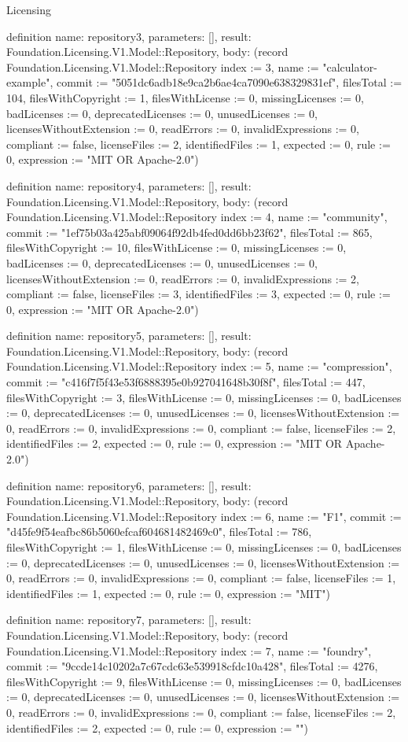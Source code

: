 \begin{lexlean}{Licensing}
\begin{semanticmodule}
definition{
  name: repository3,
  parameters: [],
  result: Foundation.Licensing.V1.Model::Repository,
  body: (record Foundation.Licensing.V1.Model::Repository {index := 3, name := "calculator-example", commit := "5051dc6adb18e9ca2b6ae4ca7090e638329831ef", filesTotal := 104, filesWithCopyright := 1, filesWithLicense := 0, missingLicenses := 0, badLicenses := 0, deprecatedLicenses := 0, unusedLicenses := 0, licensesWithoutExtension := 0, readErrors := 0, invalidExpressions := 0, compliant := false, licenseFiles := 2, identifiedFiles := 1, expected := 0, rule := 0, expression := "MIT OR Apache-2.0"})
}

definition{
  name: repository4,
  parameters: [],
  result: Foundation.Licensing.V1.Model::Repository,
  body: (record Foundation.Licensing.V1.Model::Repository {index := 4, name := "community", commit := "1ef75b03a425abf09064f92db4fed0dd6bb23f62", filesTotal := 865, filesWithCopyright := 10, filesWithLicense := 0, missingLicenses := 0, badLicenses := 0, deprecatedLicenses := 0, unusedLicenses := 0, licensesWithoutExtension := 0, readErrors := 0, invalidExpressions := 2, compliant := false, licenseFiles := 3, identifiedFiles := 3, expected := 0, rule := 0, expression := "MIT OR Apache-2.0"})
}

definition{
  name: repository5,
  parameters: [],
  result: Foundation.Licensing.V1.Model::Repository,
  body: (record Foundation.Licensing.V1.Model::Repository {index := 5, name := "compression", commit := "c416f7f5f43e53f6888395e0b927041648b30f8f", filesTotal := 447, filesWithCopyright := 3, filesWithLicense := 0, missingLicenses := 0, badLicenses := 0, deprecatedLicenses := 0, unusedLicenses := 0, licensesWithoutExtension := 0, readErrors := 0, invalidExpressions := 0, compliant := false, licenseFiles := 2, identifiedFiles := 2, expected := 0, rule := 0, expression := "MIT OR Apache-2.0"})
}

definition{
  name: repository6,
  parameters: [],
  result: Foundation.Licensing.V1.Model::Repository,
  body: (record Foundation.Licensing.V1.Model::Repository {index := 6, name := "F1", commit := "d45fe9f54eafbc86b5060efcaf604681482469c0", filesTotal := 786, filesWithCopyright := 1, filesWithLicense := 0, missingLicenses := 0, badLicenses := 0, deprecatedLicenses := 0, unusedLicenses := 0, licensesWithoutExtension := 0, readErrors := 0, invalidExpressions := 0, compliant := false, licenseFiles := 1, identifiedFiles := 1, expected := 0, rule := 0, expression := "MIT"})
}

definition{
  name: repository7,
  parameters: [],
  result: Foundation.Licensing.V1.Model::Repository,
  body: (record Foundation.Licensing.V1.Model::Repository {index := 7, name := "foundry", commit := "9ccde14c10202a7c67cdc63e539918cfdc10a428", filesTotal := 4276, filesWithCopyright := 9, filesWithLicense := 0, missingLicenses := 0, badLicenses := 0, deprecatedLicenses := 0, unusedLicenses := 0, licensesWithoutExtension := 0, readErrors := 0, invalidExpressions := 0, compliant := false, licenseFiles := 2, identifiedFiles := 2, expected := 0, rule := 0, expression := ""})
}


\end{semanticmodule}
\end{lexlean}
